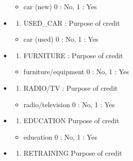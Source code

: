 \documentclass[
]{article}
\providecommand{\tightlist}{%
  \setlength{\itemsep}{0pt}\setlength{\parskip}{0pt}}
\begin{document}
\begin{itemize}
  \begin{itemize}
  \tightlist
  \item
    car (new) 0 : No, 1 : Yes
  \end{itemize}
\item
  \begin{enumerate}
  \def\labelenumi{\arabic{enumi})}
  \setcounter{enumi}{5}
  \tightlist
  \item
    USED\_CAR : Purpose of credit
  \end{enumerate}

  \begin{itemize}
  \tightlist
  \item
    car (used) 0 : No, 1 : Yes
  \end{itemize}
\item
  \begin{enumerate}
  \def\labelenumi{\arabic{enumi})}
  \setcounter{enumi}{6}
  \tightlist
  \item
    FURNITURE : Purpose of credit
  \end{enumerate}

  \begin{itemize}
  \tightlist
  \item
    furniture/equipment 0 : No, 1 : Yes
  \end{itemize}
\item
  \begin{enumerate}
  \def\labelenumi{\arabic{enumi})}
  \setcounter{enumi}{7}
  \tightlist
  \item
    RADIO/TV : Purpose of credit
  \end{enumerate}

  \begin{itemize}
  \tightlist
  \item
    radio/television 0 : No, 1 : Yes
  \end{itemize}
\item
  \begin{enumerate}
  \def\labelenumi{\arabic{enumi})}
  \setcounter{enumi}{8}
  \tightlist
  \item
    EDUCATION Purpose of credit
  \end{enumerate}

  \begin{itemize}
  \tightlist
  \item
    education 0 : No, 1 : Yes
  \end{itemize}
\item
  \begin{enumerate}
  \def\labelenumi{\arabic{enumi})}
  \setcounter{enumi}{9}
  \tightlist
  \item
    RETRAINING Purpose of credit
  \end{enumerate}


\end{itemize}
\end{document}
